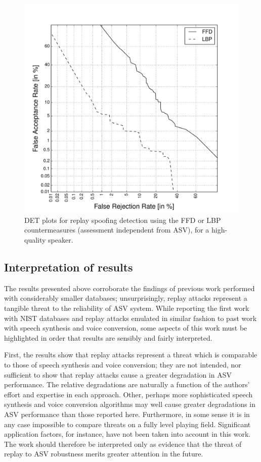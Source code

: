 \begin{figure}
	\centering
\includegraphics[width=1\linewidth]{Figs/DET_CM.pdf}
	\caption{DET plots for replay spoofing detection using the FFD or LBP countermeasures (assessment independent from ASV), for a high-quality speaker.}
	\label{fig::DETs_CM}
\end{figure}



\subsection{Interpretation of results}

The results presented above corroborate the findings of previous work performed with considerably smaller databases; unsurprisingly, replay attacks represent a tangible threat to the reliability of ASV system.  While reporting the first work with NIST databases and replay attacks emulated in similar fashion to past work with speech synthesis and voice conversion, some aspects of this work must be highlighted in order that results are sensibly and fairly interpreted.

First, the results show that replay attacks represent a threat which is comparable to those of speech synthesis and voice conversion; they are not intended, nor sufficient to show that replay attacks cause a greater degradation in ASV performance.  The relative degradations are naturally a function of the authors' effort and expertise in each approach.  Other, perhaps more sophisticated speech synthesis and voice conversion algorithms may well cause greater degradations in ASV performance than those reported here.  Furthermore, in some sense it is in any case impossible to compare threats on a fully level playing field.  Significant application factors, for instance, have not been taken into account in this work.  The work should therefore be interpreted only as evidence that the threat of replay to ASV robustness merits greater attention in the future.

